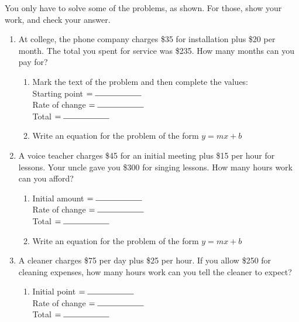 \documentclass[12pt, oneside]{article}
\begin{document}
  You only have to solve some of the problems, as shown. For those, show your work, and check your answer.
  \begin{enumerate}
    \subsubsection*{Classwork: $\pi$ Day problems!}

  \item At college, the phone company charges \$35 for installation plus \$20 per month. The total you spent for service was \$235. How many months can you pay for?
  \begin{enumerate}
    \item Mark the text of the problem and then complete the values:\\[0.5cm]
    Starting point $= \rule{2cm}{0.15mm}$ \\[0.5cm]
    Rate of change $= \rule{2cm}{0.15mm}$ \\[0.5cm]
    Total $= \rule{2cm}{0.15mm}$ \\

    \item Write an equation for the problem of the form $y=mx+b$\\[3cm]

  \end{enumerate}

  \item A voice teacher charges \$45 for an initial meeting plus \$15 per hour for lessons. Your uncle gave you \$300 for singing lessons. How many hours work can you afford?
  \begin{enumerate}
    \item Initial amount $= \rule{2cm}{0.15mm}$ \\[0.5cm]
    Rate of change $= \rule{2cm}{0.15mm}$ \\[0.5cm]
    Total $= \rule{2cm}{0.15mm}$ \\

    \item Write an equation for the problem of the form $y=mx+b$\\[1.5cm]
  \end{enumerate}

\newpage

  \item A cleaner charges \$75 per day plus \$25 per hour. If you allow \$250 for cleaning expenses, how many hours work can you tell the cleaner to expect?
  \begin{enumerate}
    \item Initial point $= \rule{2cm}{0.15mm}$ \\[0.5cm]
    Rate of change $= \rule{2cm}{0.15mm}$ \\[0.5cm]
    Total $= \rule{2cm}{0.15mm}$ \\


\end{enumerate}
\end{enumerate}
\end{document}
